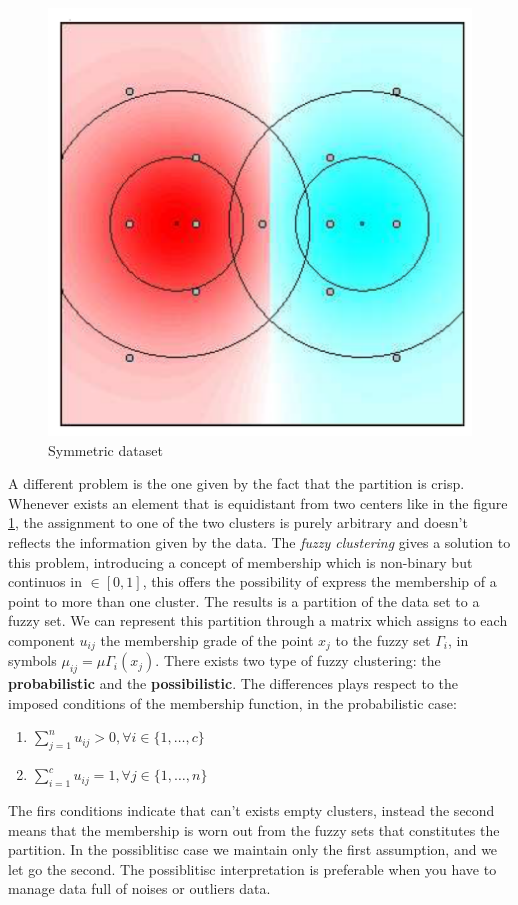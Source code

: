 \documentclass{article}
\begin{document}
\begin{figure}[H]
    \centering
    \includegraphics[scale=0.5]{images/equidistant.png}
    \caption{Symmetric dataset}
    \label{fig:symds}
\end{figure}
A different problem is the one given by the fact that the partition is crisp. Whenever
exists an element that is equidistant from two centers like in the figure \ref{fig:symds},
the assignment to one of the two clusters is purely arbitrary and doesn't reflects
the information given by the data.
\newline\newline
The \textit{fuzzy clustering} gives a solution to this problem, introducing a concept
of membership which is non-binary but continuos in $\in[0,1]$, this offers the possibility
of express the membership of a point to more than one cluster. The results is a partition
of the data set to a fuzzy set. We can represent this partition through a matrix which
assigns to each component $u_{ij}$ the membership grade of the point $x_j$ to
the fuzzy set $\Gamma_i$, in symbols $\mu_{ij}=\mu\Gamma_i(x_j)$. There exists two
type of fuzzy clustering: the \textbf{probabilistic} and the \textbf{possibilistic}. The
differences plays respect to the imposed conditions of the membership function, in the
probabilistic case:
\begin{enumerate}
    \item $\sum_{j=1}^n u_{ij}>0, \forall i\in\{1,\dots,c\}$
    \item $\sum_{i=1}^c u_{ij}=1, \forall j\in\{1,\dots,n\}$
\end{enumerate}
The firs conditions indicate that can't exists empty clusters, instead the second
means that the membership is worn out from the fuzzy sets that constitutes the partition.
In the possiblitisc case we maintain only the first assumption, and we let go the second.
\newline\newline
The possiblitisc interpretation is preferable when you have to manage data full of
noises or outliers data.
\end{document}
